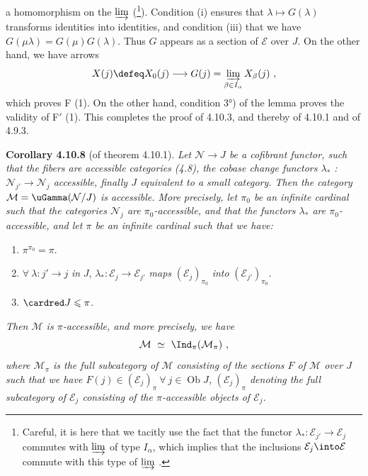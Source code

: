 
a homomorphism on the $\varinjlim$ (\footnote{Careful, it is here that we tacitly use the fact that the functor $\lambda_* : \mathcal{E}_{j'} \longrightarrow \mathcal{E}_j$ commutes with $\varinjlim$ of type $I_\alpha$, which implies that the inclusions $\mathcal{E}_j \into \mathcal{E}$ commute with this type of $\varinjlim$ .}). Condition (i) ensures that $\lambda \longmapsto G(\lambda)$ transforms identities into identities, and condition (iii) that we have $G(\mu\lambda) = G(\mu)G(\lambda)$. Thus $G$ appears as a section of $\mathcal{E}$ over $J$. On the other hand, we have arrows
\[
X(j) \defeq X_0(j) \longrightarrow G(j) = \varinjlim_{\beta\in I_\alpha} X_\beta(j) \ ,
\]
which proves F (1). On the other hand, condition 3°) of the lemma proves the validity of F$'$ (1). This completes the proof of 4.10.3, and thereby of 4.10.1 and of 4.9.3.


\textbf{Corollary 4.10.8} (of theorem 4.10.1). \textit{Let $\mathcal{N} \longrightarrow J$ be a cofibrant functor, such that the fibers are accessible categories (4.8), the cobase change functors $\lambda_*$ : $\mathcal{N}_{j'} \longrightarrow \mathcal{N}_j$ accessible, finally $J$ equivalent to a small category. Then the category $\mathcal{M} = \uGamma(\mathcal{N}/J)$ is accessible. More precisely, let $\pi_0$ be an infinite cardinal such that the categories $\mathcal{N}_j$ are $\pi_0$-accessible, and that the functors $\lambda_*$ are $\pi_0$-accessible, and let $\pi$ be an infinite cardinal such that we have:}
\begin{enumerate}[leftmargin=*]
\item[\cercle{a}] $\pi^{\pi_0} = \pi$.
\item[\cercle{b}] $\forall\ \lambda : j' \longrightarrow j$ \textit{in} $J$, $\lambda_* : \mathcal{E}_j \longrightarrow \mathcal{E}_{j'}$ \textit{maps} $(\mathcal{E}_j)_{\pi_0}$ \textit{into} $(\mathcal{E}_{j'})_{\pi_0}$.
\item[\cercle{c}] $\cardred J \leqslant \pi$.
\end{enumerate}
\textit{Then $\mathcal{M}$ is $\pi$-accessible, and more precisely, we have}
\[
\mathcal{M} \ \simeq \ \Ind_\pi(\mathcal{M}_\pi) \ ,
\]
\textit{where $\mathcal{M}_\pi$ is the full subcategory of $\mathcal{M}$ consisting of the sections $F$ of $\mathcal{M}$ over $J$ such that we have $F(j) \in (\mathcal{E}_j)_\pi \ \forall\ j \in \operatorname{Ob} J$,}  \textit{$(\mathcal{E}_j)_\pi$ denoting the full subcategory of $\mathcal{E}_j$ consisting of the $\pi$-accessible objects of $\mathcal{E}_j$.}

